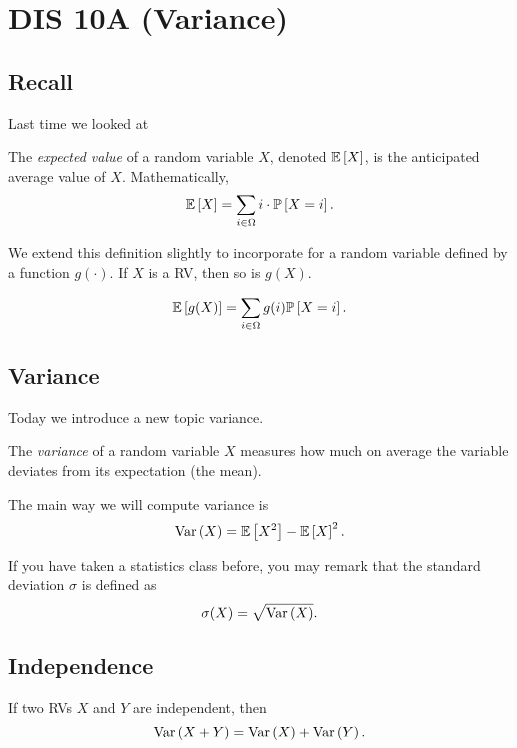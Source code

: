 \section{DIS 10A (Variance)}

\subsection{Recall}
Last time we looked at 
\begin{definition}
    The \textit{expected value} of a random variable $X$, denoted $\mathbb{E}\left[ X \right]$, is the anticipated average value of $X$. Mathematically, \[ \mathbb{E}\left[ X \right] = \sum_{i \in \Omega} i \cdot \mathbb{P}\left[ X = i \right]. \]
\end{definition}

We extend this definition slightly to incorporate for a random variable defined by a function $g(\cdot)$. If $X$ is a RV, then so is $g(X)$. 

\begin{theorem}
    \[ \mathbb{E}\left[ g(X) \right] = \sum_{i \in \Omega} g(i) \mathbb{P}\left[ X = i \right]. \]
\end{theorem}

\subsection{Variance}

Today we introduce a new topic variance. 

\begin{definition}[Variance]
    The \textit{variance} of a random variable $X$ measures how much on average the variable deviates from its expectation (the mean).
\end{definition}

The main way we will compute variance is \[ \text{Var}\left( X \right) = \mathbb{E}\left[ X^2 \right] - \mathbb{E}\left[ X \right]^2. \]

If you have taken a statistics class before, you may remark that the standard deviation $\sigma$ is defined as \[ \sigma(X) = \sqrt{\text{Var}\left( X \right)}. \]

\subsection{Independence}

If two RVs $X$ and $Y$ are independent, then \[ \text{Var}\left( X+Y \right) = \text{Var}\left( X \right) + \text{Var}\left( Y \right). \]